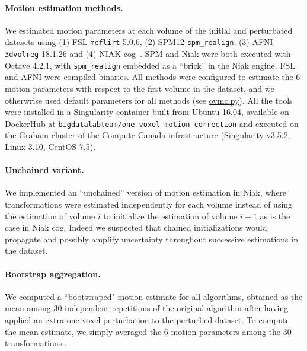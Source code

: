 \documentclass[11pt]{IEEEtran}
\begin{document}

\paragraph{Motion estimation methods.}
We estimated motion parameters at each volume of the initial and
perturbated datasets using (1) FSL \texttt{mcflirt} 5.0.6, (2) SPM12
\texttt{spm\_realign}, (3) AFNI \texttt{3dvolreg} 18.1.26 and (4) NIAK
cog~\cite{niak}. SPM and Niak were both executed with Octave 4.2.1, with
\texttt{spm\_realign} embedded as a ``brick'' in the Niak engine. FSL and
AFNI were compiled binaries. All methods were configured to estimate the 6
motion parameters with respect to the first volume in the dataset, and we otherwrise used
default parameters for all methods (see \href{https://github.com/big-data-lab-team/one-voxel-motion-correction/blob/master/ovmc/ovmc.py}{ovmc.py}).
 All the tools were installed in a
Singularity container built from Ubuntu 16.04, available on DockerHub at
\texttt{bigdatalabteam/one-voxel-motion-correction} and executed on the
Graham cluster of the Compute Canada infrastructure (Singularity v3.5.2,
Linux 3.10, CentOS 7.5). 

\paragraph{Unchained variant.} We implemented an ``unchained'' version of
motion estimation in Niak, where transformations were estimated
independently for each volume instead of using the estimation of volume $i$
to initialize the estimation of volume $i+1$ as is the case in Niak cog.
Indeed we suspected that chained initializations would propagate and
possibly amplify uncertainty throughout successive estimations in the
dataset.

\paragraph{Bootstrap aggregation.} We computed a ``bootstraped" motion
estimate for all algorithms, obtained as the mean among 30 independent
repetitions of the original algorithm after having applied an extra
one-voxel perturbation to the perturbed dataset. To compute the mean
estimate, we simply averaged the 6 motion parameters among the 30
transformations . 
\end{document}
